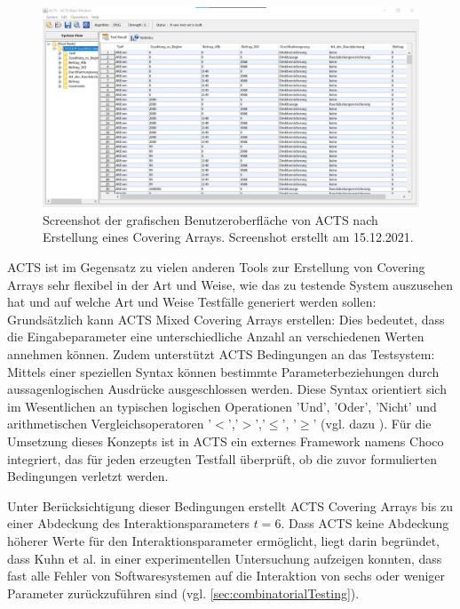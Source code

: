 \begin{figure}[!htb]
\centering
\includegraphics[width=0.8\columnwidth]{images/Screenshot_ACTS.jpg}
\caption{Screenshot der grafischen Benutzeroberfläche von ACTS nach Erstellung eines Covering Arrays. Screenshot erstellt am 15.12.2021.}
\label{fig:acts}
\end{figure}

ACTS ist im Gegensatz zu vielen anderen Tools zur Erstellung von Covering Arrays sehr flexibel in der Art und Weise, wie das zu testende System auszusehen hat und auf welche Art und Weise Testfälle generiert werden sollen: Grundsätzlich kann ACTS Mixed Covering Arrays erstellen: Dies bedeutet, dass die Eingabeparameter eine unterschiedliche Anzahl an verschiedenen Werten annehmen können. Zudem unterstützt ACTS Bedingungen an das Testsystem: Mittels einer speziellen Syntax können bestimmte Parameterbeziehungen durch aussagenlogischen Ausdrücke ausgeschlossen werden. Diese Syntax orientiert sich im Wesentlichen an typischen logischen Operationen 'Und', 'Oder', 'Nicht' und arithmetischen Vergleichsoperatoren '$<$','$>$','$\leq$', '$\geq$' (vgl. dazu \cite{yu2013acts}). Für die Umsetzung dieses Konzepts ist in ACTS ein externes Framework namens Choco \cite{solver} integriert, das für jeden erzeugten Testfall überprüft, ob die zuvor formulierten Bedingungen verletzt werden.

Unter Berücksichtigung dieser Bedingungen erstellt ACTS Covering Arrays bis zu einer Abdeckung des Interaktionsparameters $t = 6$. Dass ACTS keine Abdeckung höherer Werte für den Interaktionsparameter ermöglicht, liegt darin begründet, dass Kuhn et al. \cite{kuhn2004error} in einer experimentellen Untersuchung aufzeigen konnten, dass fast alle Fehler von Softwaresystemen auf die Interaktion von sechs oder weniger Parameter zurückzuführen sind (vgl. \autoref{sec:combinatorialTesting}). 

